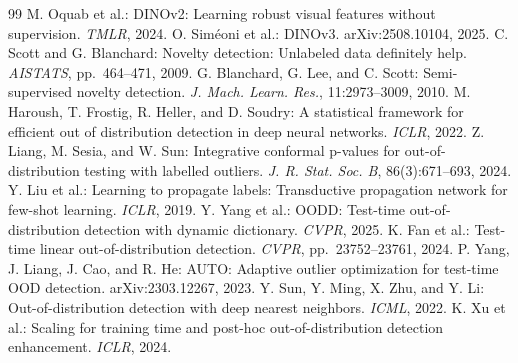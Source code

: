 \begin{thebibliography}{99}
 M. Oquab et al.: DINOv2: Learning robust visual features without supervision. \textit{TMLR}, 2024.
 O. Sim\'{e}oni et al.: DINOv3. arXiv:2508.10104, 2025.
 C. Scott and G. Blanchard: Novelty detection: Unlabeled data definitely help. \textit{AISTATS}, pp.~464--471, 2009.
 G. Blanchard, G. Lee, and C. Scott: Semi-supervised novelty detection. \textit{J. Mach. Learn. Res.}, 11:2973--3009, 2010.
 M. Haroush, T. Frostig, R. Heller, and D. Soudry: A statistical framework for efficient out of distribution detection in deep neural networks. \textit{ICLR}, 2022.
 Z. Liang, M. Sesia, and W. Sun: Integrative conformal p-values for out-of-distribution testing with labelled outliers. \textit{J. R. Stat. Soc. B}, 86(3):671--693, 2024.
 Y. Liu et al.: Learning to propagate labels: Transductive propagation network for few-shot learning. \textit{ICLR}, 2019.
 Y. Yang et al.: OODD: Test-time out-of-distribution detection with dynamic dictionary. \textit{CVPR}, 2025.
 K. Fan et al.: Test-time linear out-of-distribution detection. \textit{CVPR}, pp.~23752--23761, 2024.
 P. Yang, J. Liang, J. Cao, and R. He: AUTO: Adaptive outlier optimization for test-time OOD detection. arXiv:2303.12267, 2023.
 Y. Sun, Y. Ming, X. Zhu, and Y. Li: Out-of-distribution detection with deep nearest neighbors. \textit{ICML}, 2022.
 K. Xu et al.: Scaling for training time and post-hoc out-of-distribution detection enhancement. \textit{ICLR}, 2024.
\end{thebibliography}
